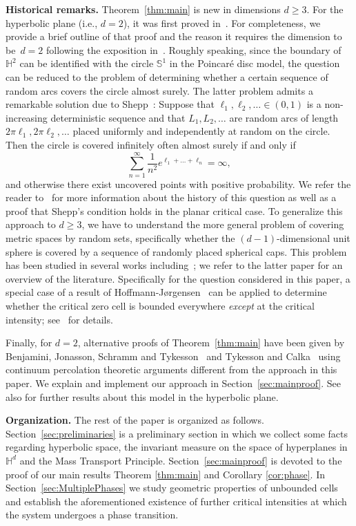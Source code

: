 \documentclass[12pt,a4paper]{article}
\theoremstyle{definition}
\begin{document}
{\bf\noindent Historical remarks.} Theorem~\ref{thm:main} is new in dimensions $d\ge3$. For the hyperbolic plane (i.e., $d=2$), it was first proved in~\cite{P07}. For completeness, we provide a brief outline of that proof and the reason it requires the dimension to be~$d=2$ following the exposition in~\cite[Section 4]{GKT}. 
Roughly speaking, since the boundary of $\mathbb H^2$ can be identified with the circle $\mathbb{S}^1$ in the Poincaré disc model, the question can be reduced to the problem of determining whether a certain sequence of random arcs covers the circle almost surely. The latter problem admits a remarkable solution due to Shepp~\cite{S72}: Suppose that $\ell_1,\ell_2,\ldots \in(0,1)$ is a non-increasing deterministic sequence and that $L_1,L_2,\ldots$ are random arcs of length $2\pi\ell_1,2\pi\ell_2,\ldots$ placed uniformly and independently at random on the circle. Then the circle is covered infinitely often almost surely if and only if
$$
\sum_{n=1}^\infty \frac{1}{n^2}e^{\ell_1+\ldots+\ell_n} = \infty,
$$
and otherwise there exist uncovered points with positive probability.
We refer the reader to~\cite{GKT} for more information about the history of this question as well as a proof that Shepp's condition holds in the planar critical case. To generalize this approach to $d\ge3$, we have to understand the more general problem of covering metric spaces by random sets, specifically whether the $(d-1)$-dimensional unit sphere is covered by a sequence of randomly placed spherical caps. This problem has been studied in several works including~\cite{H73,FJJS18}; we refer to the latter paper for an overview of the literature. 
Specifically for the question considered in this paper, a special case of a result of Hoffmann-J{\o}rgensen~\cite{H73} can be applied to determine whether the critical zero cell is bounded everywhere {\em except} at the critical intensity; see~\cite[Theorem~4.1 \& Remark~4.3]{GKT} for details.

Finally, for $d=2$, alternative proofs of Theorem~\ref{thm:main} have been given by Benjamini, Jonasson, Schramm and Tykesson~\cite[Proposition 6.1]{BJST09} and Tykesson and Calka~\cite{TC13} using continuum percolation theoretic arguments different from the approach in this paper. We explain and implement our approach in Section~\ref{sec:mainproof}. See~\cite{TC13} also for further results about this model in the hyperbolic plane. 


\medskip

{\bf\noindent Organization.} The rest of the paper is organized as follows. Section~\ref{sec:preliminaries} is a preliminary section in which we collect some facts regarding hyperbolic space, the invariant measure on the space of hyperplanes in $\mathbb{H}^d$ and the Mass Transport Principle. Section~\ref{sec:mainproof} is devoted to the proof of our main results Theorem \ref{thm:main} and Corollary \ref{cor:phase}. In Section~\ref{sec:MultiplePhases} we study geometric properties of unbounded cells and establish the aforementioned existence of further critical intensities at which the system undergoes a phase transition.
\end{document}
